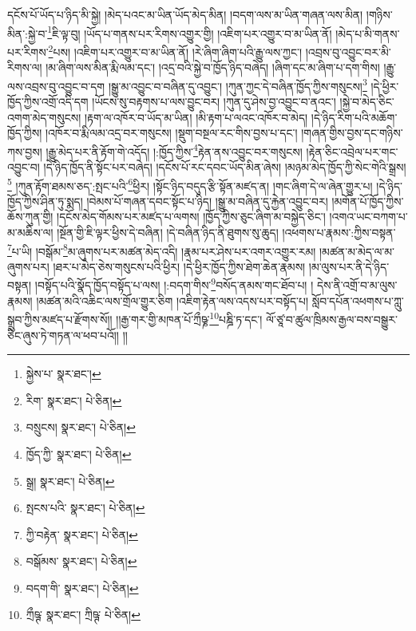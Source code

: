 དངོས་པོ་ཡོད་པ་ཉིད་མི་སྐྱེ། །མེད་པའང་མ་ཡིན་ཡོད་མེད་མིན། །བདག་ལས་མ་ཡིན་གཞན་ལས་མིན། །གཉིས་མིན་:སྐྱེ་བ་\footnote{སྐྱེས་པ་  སྣར་ཐང་། }ཇི་ལྟ་བུ། །ཡོད་པ་གནས་པར་རིགས་འགྱུར་གྱི། །འཇིག་པར་འགྱུར་བ་མ་ཡིན་ནོ། །མེད་པ་མི་གནས་པར་རིགས་\footnote{རིག་  སྣར་ཐང་།  པེ་ཅིན། }པས། །འཇིག་པར་འགྱུར་བ་མ་ཡིན་ནོ། །རེ་ཞིག་ཞིག་པའི་རྒྱུ་ལས་ཀྱང་། །འབྲས་བུ་འབྱུང་བར་མི་རིགས་ལ། །མ་ཞིག་ལས་མིན་རྨི་ལམ་དང་། །འདྲ་བའི་སྐྱེ་བ་ཁྱོད་ཉིད་བཞེད། །ཞིག་དང་མ་ཞིག་པ་དག་གིས། །རྒྱུ་ལས་འབྲས་བུ་འབྱུང་བ་དག །སྒྱུ་མ་འབྱུང་བ་བཞིན་དུ་འབྱུང་། །ཀུན་ཀྱང་དེ་བཞིན་ཁྱོད་ཀྱིས་གསུངས།\footnote{བསྲུངས།  སྣར་ཐང་།  པེ་ཅིན། } །དེ་ཕྱིར་ཁྱོད་ཀྱིས་འགྲོ་འདི་དག །ཡོངས་སུ་བརྟགས་པ་ལས་བྱུང་བར། །ཀུན་དུ་ཤེས་བྱ་འབྱུང་བ་ནའང་། །སྐྱེ་བ་མེད་ཅིང་འགག་མེད་གསུངས། །རྟག་ལ་འཁོར་བ་ཡོད་མ་ཡིན། །མི་རྟག་པ་ལའང་འཁོར་བ་མེད། །དེ་ཉིད་རིག་པའི་མཆོག་ཁྱོད་ཀྱིས། །འཁོར་བ་རྨི་ལམ་འདྲ་བར་གསུངས། །སྡུག་བསྔལ་རང་གིས་བྱས་པ་དང་། །གཞན་གྱིས་བྱས་དང་གཉིས་ཀས་བྱས། །རྒྱུ་མེད་པར་ནི་རྟོག་གེ་འདོད། །:ཁྱོད་ཀྱིས་\footnote{ཁྱོད་ཀྱི་  སྣར་ཐང་།  པེ་ཅིན། }རྟེན་ནས་འབྱུང་བར་གསུངས། །རྟེན་ཅིང་འབྲེལ་པར་གང་འབྱུང་བ། །དེ་ཉིད་ཁྱོད་ནི་སྟོང་པར་བཞེད། །དངོས་པོ་རང་དབང་ཡོད་མིན་ཞེས། །མཉམ་མེད་ཁྱོད་ཀྱི་སེང་གེའི་སྒྲས།\footnote{སྒྲ།  སྣར་ཐང་།  པེ་ཅིན། } །ཀུན་རྟོག་ཐམས་ཅད་:སྤང་པའི་\footnote{སྤངས་པའི་  སྣར་ཐང་།  པེ་ཅིན། }ཕྱིར། །སྟོང་ཉིད་བདུད་རྩི་སྟོན་མཛད་ན། །གང་ཞིག་དེ་ལ་ཞེན་གྱུར་པ། །དེ་ཉིད་ཁྱོད་ཀྱིས་ཤིན་ཏུ་སྨད། །བེམས་པོ་གཞན་དབང་སྟོང་པ་ཉིད། །སྒྱུ་མ་བཞིན་དུ་རྐྱེན་འབྱུང་བར། །མགོན་པོ་ཁྱོད་ཀྱིས་ཆོས་ཀུན་གྱི། །དངོས་མེད་གོམས་པར་མཛད་པ་ལགས། །ཁྱོད་ཀྱིས་ཅུང་ཞིག་མ་བསྐྱེད་ཅིང་། །འགའ་ཡང་བཀག་པ་མ་མཆིས་ལ། །སྔོན་གྱི་ཇི་ལྟར་ཕྱིས་དེ་བཞིན། །དེ་བཞིན་ཉིད་ནི་ཐུགས་སུ་ཆུད། །འཕགས་པ་རྣམས་:ཀྱིས་བསྟན་\footnote{ཀྱི་བརྟེན་  སྣར་ཐང་།  པེ་ཅིན། }པ་ཡི། །བསྒོམ་\footnote{བསྒོམས་  སྣར་ཐང་།  པེ་ཅིན། }མ་ཞུགས་པར་མཚན་མེད་འདི། །རྣམ་པར་ཤེས་པར་འགར་འགྱུར་རམ། །མཚན་མ་མེད་ལ་མ་ཞུགས་པར། །ཐར་པ་མེད་ཅེས་གསུངས་པའི་ཕྱིར། །དེ་ཕྱིར་ཁྱོད་ཀྱིས་ཐེག་ཆེན་རྣམས། །མ་ལུས་པར་ནི་དེ་ཉིད་བསྟན། །བསྟོད་པའི་སྣོད་ཁྱོད་བསྟོད་པ་ལས། །:བདག་གིས་\footnote{བདག་གི་  སྣར་ཐང་།  པེ་ཅིན། }བསོད་ནམས་གང་ཐོབ་པ། །
དེས་ནི་འགྲོ་བ་མ་ལུས་རྣམས། །མཚན་མའི་འཆིང་ལས་གྲོལ་གྱུར་ཅིག །འཇིག་རྟེན་ལས་འདས་པར་བསྟོད་པ། སློབ་དཔོན་འཕགས་པ་ཀླུ་སྒྲུབ་ཀྱིས་མཛད་པ་རྫོགས་སོ།། །།རྒྱ་གར་གྱི་མཁན་པོ་ཀྲྀཥྞ་\footnote{ཀྲྀཥྚ་  སྣར་ཐང་། ཀྲིཥྚ་  པེ་ཅིན། }པཎྜི་ཏ་དང་། ལོ་ཙཱ་བ་ཚུལ་ཁྲིམས་རྒྱལ་བས་བསྒྱུར་ཅིང་ཞུས་ཏེ་གཏན་ལ་ཕབ་པའོ།། །།